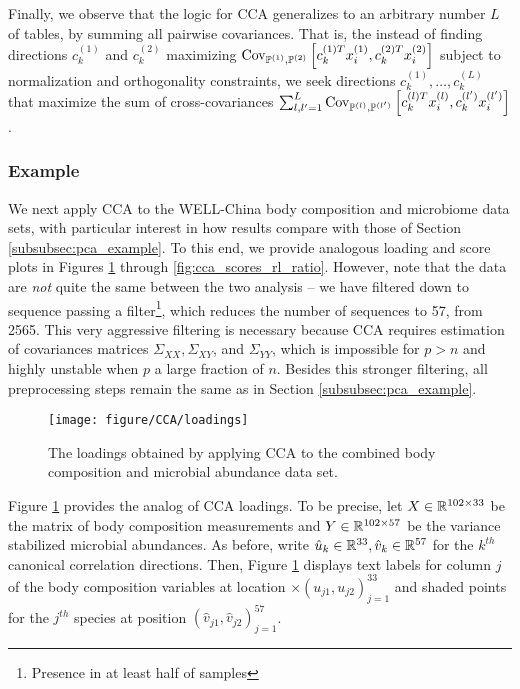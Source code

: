 \documentclass{article}
\begin{document}
Finally, we observe that the logic for CCA generalizes to an arbitrary number
$L$ of tables, by summing all pairwise covariances. That is, the instead of
finding directions $c_{k}^{(1)}$ and $c_{k}^{(2)}$ maximizing
$\mathrm{Cov}_{\mathbb{P}^{(1)}, \mathbb{P}^{(2)}}\left[{c_{k}^{(1)T}x_{i}^{(1)},
  c_{k}^{(2)T}x_{i}^{(2)}}\right]$ subject to normalization and orthogonality
constraints, we seek directions $c_{k}^{(1)}, \dots, c_{k}^{(L)}$ that maximize
the sum of cross-covariances $\sum_{l,l^{\prime} = 1}^{L} \mathrm{Cov}_{\mathbb{P}^{(l)},
  \mathbb{P}^{(l^{\prime})}}\left[{c_{k}^{(l) T}x_{i}^{(l)},
  c_{k}^{(l^{\prime})}x_{i}^{(l^{\prime})}}\right]$.

\subsubsection{Example}
\label{subsubsec:cca_example}

We next apply CCA to the WELL-China body composition and microbiome data sets,
with particular interest in how results compare with those of
Section \ref{subsubsec:pca_example}. To this end, we provide analogous loading and score
plots in Figures \ref{fig:cca_loadings} through \ref{fig:cca_scores_rl_ratio}.
However, note that the data are \textit{not} quite the same between the two
analysis -- we have filtered down to sequence passing a filter\footnote{Presence
  in at least half of samples}, which reduces the number of sequences to 57,
from 2565. This very aggressive filtering is necessary because CCA requires
estimation of covariances matrices $\Sigma_{XX}, \Sigma_{XY}$, and
$\Sigma_{YY}$, which is impossible for $p > n$ and highly unstable when $p$ a
large fraction of $n$. Besides this stronger filtering, all preprocessing steps
remain the same as in Section \ref{subsubsec:pca_example}.

\begin{figure}[ht]
  \centering
  \texttt{[image: figure/CCA/loadings]}
  \caption{The loadings obtained by applying CCA to the combined body
    composition and microbial abundance data set. \label{fig:cca_loadings} }
\end{figure}

Figure \ref{fig:cca_loadings} provides the analog of CCA loadings. To be
precise, let $X \in \mathbb{R}^{102\times 33}$ be the matrix of body composition
measurements and $Y \in \mathbb{R}^{102 \times 57}$ be the variance stabilized
microbial abundances. As before, write $\hat{u}_{k} \in \mathbb{R}^{33}, \hat{v}_{k}
\in \mathbb{R}^{57}$ for the $k^{th}$ canonical correlation directions. Then, Figure
\ref{fig:cca_loadings} displays text labels for column $j$ of the body
composition variables at location $\times \left(u_{j1}, u_{j2}\right)_{j =
  1}^{33}$ and shaded points for the $j^{th}$ species at position
$\left(\hat{v}_{j1}, \hat{v}_{j2}\right)_{j = 1}^{57}$.
\end{document}
